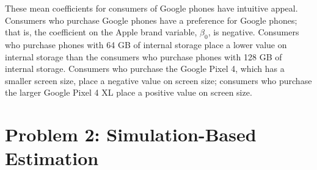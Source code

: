 \documentclass[11pt,letterpaper]{article}\usepackage[]{graphicx}\usepackage[]{color}
\begin{document}
\begin{enumerate}[label=\alph*., leftmargin=*]
	These mean coefficients for consumers of Google phones have intuitive appeal. Consumers who purchase Google phones have a preference for Google phones; that is, the coefficient on the Apple brand variable, $\beta_0$, is negative. Consumers who purchase phones with 64 GB of internal storage place a lower value on internal storage than the consumers who purchase phones with 128 GB of internal storage. Consumers who purchase the Google Pixel 4, which has a smaller screen size, place a negative value on screen size; consumers who purchase the larger Google Pixel 4 XL place a positive value on screen size.
\end{enumerate}

\section*{Problem 2: Simulation-Based Estimation}
\end{document}
